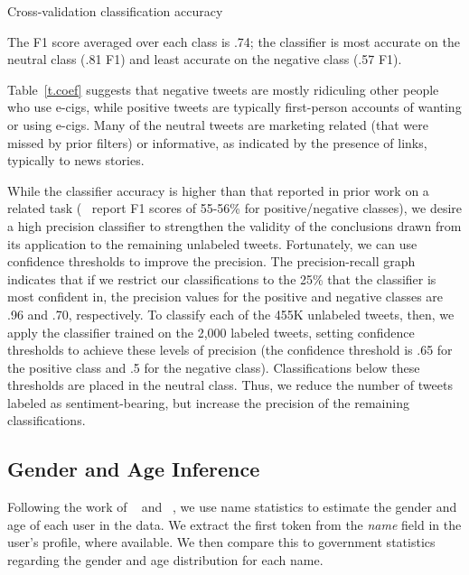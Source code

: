 \documentclass{sig-alternate}
\newcommand{\citenoun}[1]{{\citeauthor{#1}~\cite{#1}}}
\begin{document}
\begin{table}[t]
\caption{Cross-validation classification accuracy \label{t.measure}}
\centering

\end{table}




The F1 score averaged over each class is .74; the classifier is most accurate on the neutral class (.81 F1) and least accurate on the negative class (.57 F1).

Table~\ref{t.coef} suggests that negative tweets are mostly ridiculing other people who use e-cigs, while positive tweets are typically first-person accounts of wanting or using e-cigs. Many of the neutral tweets are marketing related (that were missed by prior filters) or informative, as indicated by the presence of links, typically to news stories.

While the classifier accuracy is higher than that reported in prior work on a
related task (\citenoun{godea2015analysis} report F1 scores of 55-56\% for
positive/negative classes), we desire a high precision classifier to
strengthen the validity of the conclusions drawn from its application to the
remaining unlabeled tweets. Fortunately, we can use confidence thresholds to
improve the precision. The precision-recall graph indicates that if we
restrict our classifications to the 25\% that the classifier is most confident
in, the precision values for the positive and negative classes are .96 and
.70, respectively. To classify each of the 455K unlabeled tweets, then, we
apply the classifier trained on the 2,000 labeled tweets, setting confidence
thresholds to achieve these levels of precision (the confidence threshold is
.65 for the positive class and .5 for the negative class). Classifications
below these thresholds are placed in the neutral class. Thus, we reduce the
number of tweets labeled as sentiment-bearing, but increase the precision of
the remaining classifications.

\subsection{Gender and Age Inference}

Following the work of \citenoun{paval2015confounds} and
\citenoun{silver2014how}, we use name statistics to estimate the gender and
age of each user in the data. We extract the first token from the {\it name} field in the user's profile, where available. We then compare this to government statistics regarding the gender and age distribution for each name.
\end{document}
